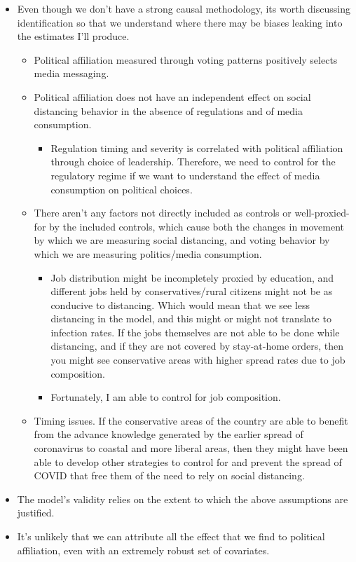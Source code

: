 \documentclass{article}
\begin{document}
\begin{itemize}
	\item Even though we don't have a strong causal methodology, its worth discussing identification so that we understand where there may be biases leaking into the estimates I'll produce. 
	\begin{itemize}
	\item Political affiliation measured through voting patterns positively selects media messaging.
	\item Political affiliation does not have an independent effect on social distancing behavior in the absence of regulations and of media consumption.
	\begin{itemize}
		\item Regulation timing and severity is correlated with political affiliation through choice of leadership. Therefore, we need to control for the regulatory regime if we want to understand the effect of media consumption on political choices. 
	\end{itemize}
	\item There aren't any factors not directly included as controls or well-proxied-for by the included controls, which cause both the changes in movement by which we are measuring social distancing, and voting behavior by which we are measuring politics/media consumption.
	\begin{itemize}
		\item Job distribution might be incompletely proxied by education, and different jobs held by conservatives/rural citizens might not be as conducive to distancing. Which would mean that we see less distancing in the model, and this might or might not translate to infection rates. If the jobs themselves are not able to be done while distancing, and if they are not covered by stay-at-home orders, then you might see conservative areas with higher spread rates due to job composition. 
		\item Fortunately, I am able to control for job composition.
	\end{itemize}
	\item Timing issues. If the conservative areas of the country are able to benefit from the advance knowledge generated by the earlier spread of coronavirus to coastal and more liberal areas, then they might have been able to develop other strategies to control for and prevent the spread of COVID that free them of the need to rely on social distancing. 
	\end{itemize}
	\item The model's validity relies on the extent to which the above assumptions are justified. 
	\item It's unlikely that we can attribute all the effect that we find to political affiliation, even with an extremely robust set of covariates.
\end{itemize}
\end{document}

